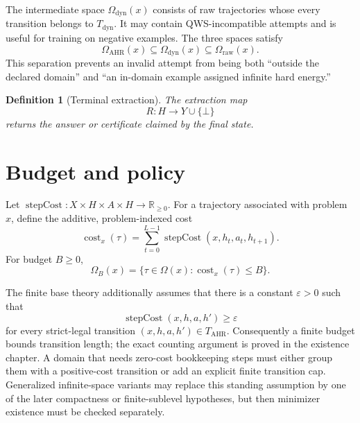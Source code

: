 \documentclass[11pt,oneside]{book}
\newtheorem{definition}{Definition}[chapter]
\theoremstyle{remark}
\newcommand{\Om}{\Omega}
\newcommand{\eps}{\varepsilon}
\DeclareMathOperator{\cost}{cost}
\begin{document}
The intermediate space $\Om_{\mathrm{dyn}}(x)$ consists of raw trajectories
whose every transition belongs to $T_{\mathrm{dyn}}$. It may contain
QWS-incompatible attempts and is useful for training on negative examples.
The three spaces satisfy
\[
\Om_{\mathrm{AHR}}(x)
\subseteq\Om_{\mathrm{dyn}}(x)
\subseteq\Om_{\mathrm{raw}}(x).
\]
This separation prevents an invalid attempt from being both ``outside the
declared domain'' and ``an in-domain example assigned infinite hard energy.''

\begin{definition}[Terminal extraction]
The extraction map
\[
R:H\longrightarrow Y\cup\{\bot\}
\]
returns the answer or certificate claimed by the final state.
\end{definition}

\section{Budget and policy}

Let
$\operatorname{stepCost}:X\times H\times A\times H\to\mathbb R_{\ge0}$.
For a trajectory associated with problem $x$, define the additive,
problem-indexed cost
\[
\cost_x(\tau)
=\sum_{t=0}^{L-1}\operatorname{stepCost}(x,h_t,a_t,h_{t+1}).
\]
For budget $B\ge0$,
\[
\Om_B(x)=\{\tau\in\Om(x):\cost_x(\tau)\le B\}.
\]

The finite base theory additionally assumes that there is a constant
$\eps>0$ such that
\[
\operatorname{stepCost}(x,h,a,h')\ge\eps
\]
for every strict-legal transition $(x,h,a,h')\in T_{\mathrm{AHR}}$.
Consequently a finite budget bounds transition length; the exact counting
argument is proved in the existence chapter. A domain that needs zero-cost
bookkeeping steps must either group them with a positive-cost transition or
add an explicit finite transition cap. Generalized infinite-space variants
may replace this standing assumption by one of the later compactness or
finite-sublevel hypotheses, but then minimizer existence must be checked
separately.
\end{document}
